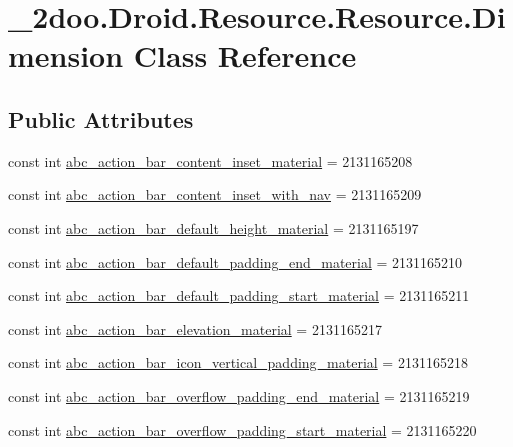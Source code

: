 \hypertarget{class__2doo_1_1_droid_1_1_resource_1_1_dimension}{
\section{\_\-2doo.Droid.Resource.Resource.Dimension Class Reference}
\label{class__2doo_1_1_droid_1_1_resource_1_1_dimension}
}
\subsection*{Public Attributes}
\begin{CompactItemize}
\item 
const int \hyperlink{class__2doo_1_1_droid_1_1_resource_1_1_dimension_e8b056569d0b91674455038ddfef9ade}{abc\_\-action\_\-bar\_\-content\_\-inset\_\-material} = 2131165208
\item 
const int \hyperlink{class__2doo_1_1_droid_1_1_resource_1_1_dimension_a452a30fa9ed89264c9bfe658d13ae82}{abc\_\-action\_\-bar\_\-content\_\-inset\_\-with\_\-nav} = 2131165209
\item 
const int \hyperlink{class__2doo_1_1_droid_1_1_resource_1_1_dimension_cb4e92712be2253befecba1bc08b1086}{abc\_\-action\_\-bar\_\-default\_\-height\_\-material} = 2131165197
\item 
const int \hyperlink{class__2doo_1_1_droid_1_1_resource_1_1_dimension_647691e495b77f2e83d65f3c1278a23e}{abc\_\-action\_\-bar\_\-default\_\-padding\_\-end\_\-material} = 2131165210
\item 
const int \hyperlink{class__2doo_1_1_droid_1_1_resource_1_1_dimension_f8d9f4644b725cc37bef3e5fdc7d7add}{abc\_\-action\_\-bar\_\-default\_\-padding\_\-start\_\-material} = 2131165211
\item 
const int \hyperlink{class__2doo_1_1_droid_1_1_resource_1_1_dimension_396d6d24edd3570ed643c08858db0f51}{abc\_\-action\_\-bar\_\-elevation\_\-material} = 2131165217
\item 
const int \hyperlink{class__2doo_1_1_droid_1_1_resource_1_1_dimension_6d84fc1f134e1ffe45540ec81a22989f}{abc\_\-action\_\-bar\_\-icon\_\-vertical\_\-padding\_\-material} = 2131165218
\item 
const int \hyperlink{class__2doo_1_1_droid_1_1_resource_1_1_dimension_cd8fc1a6923a0f93d73d39eb067ccc02}{abc\_\-action\_\-bar\_\-overflow\_\-padding\_\-end\_\-material} = 2131165219
\item 
const int \hyperlink{class__2doo_1_1_droid_1_1_resource_1_1_dimension_7235f2c9a4ae573d446520ac98f973d0}{abc\_\-action\_\-bar\_\-overflow\_\-padding\_\-start\_\-material} = 2131165220

\end{CompactItemize}

